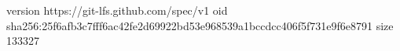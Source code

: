 version https://git-lfs.github.com/spec/v1
oid sha256:25f6afb3c7fff6ac42fe2d69922bd53e968539a1bccdcc406f5f731e9f6e8791
size 133327
